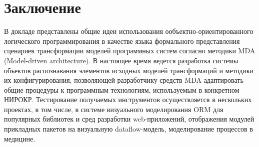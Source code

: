 \documentclass[12pt]{article}
\begin{document}

\section*{Заключение}

В докладе представлены общие идеи использования ообъектно-ориентированного логического программирования в качестве языка формального представления сценариев трансформации моделей программных систем согласно методики MDA (Model-driven architecture).  В настоящее время ведется разработка системы объектов распознавания элементов исходных моделей трансформаций и методики их конфигурирования, позволяющей разработчику средств MDA адаптировать общие процедуры к программным технологиям, используемым в конкретном НИРОКР.  Тестирование получаемых инструментов осуществляется в нескольких проектах, в том числе, в системе визуального моделирования ORM для популярных библиотек и сред разработки web-приложений, отображения модулей прикладных пакетов на визуальную dataflow-модель, моделирование процессов в медицине.

%
\end{document}
